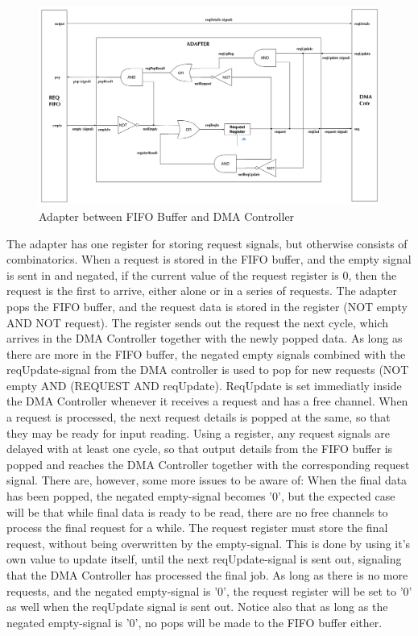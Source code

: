 \begin{figure}[h!]
    \centering
    \includegraphics[width=1.0\textwidth]{Figures/DMA/Adapter}
    \caption{Adapter between FIFO Buffer and DMA Controller}
    \label{fig:adapter}
\end{figure}

The adapter has one register for storing request signals, but otherwise consists of combinatorics.
When a request is stored in the FIFO buffer, and the empty signal is sent in and negated, if the current value of the request register is 0, then the request is the first to arrive, either alone or in a series of requests.
The adapter pops the FIFO buffer, and the request data is stored in the register (NOT empty AND NOT request).
The register sends out the request the next cycle, which arrives in the DMA Controller together with the newly popped data.
As long as there are more in the FIFO buffer, the negated empty signals combined with the reqUpdate-signal from the DMA controller is used to pop for new requests (NOT empty AND (REQUEST AND reqUpdate).
ReqUpdate is set immediatly inside the DMA Controller whenever it receives a request and has a free channel.
When a request is processed, the next request details is popped at the same, so that they may be ready for input reading.
Using a register, any request signals are delayed with at least one cycle, so that output details from the FIFO buffer is popped and reaches the DMA Controller together with the corresponding request signal.
There are, however, some more issues to be aware of:
When the final data has been popped, the negated empty-signal becomes '0', but the expected case will be that while final data is ready to be read, there are no free channels to process the final request for a while.
The request register must store the final request, without being overwritten by the empty-signal.
This is done by using it's own value to update itself, until the next reqUpdate-signal is sent out, signaling that the DMA Controller has processed the final job.
As long as there is no more requests, and the negated empty-signal is '0', the request register will be set to '0' as well when the reqUpdate signal is sent out.
Notice also that as long as the negated empty-signal is '0', no pops will be made to the FIFO buffer either. 


